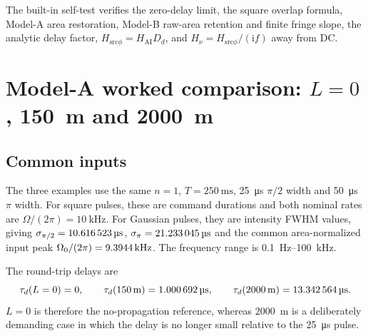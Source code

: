 \documentclass[11pt,a4paper]{article}
\newcommand{\ii}{\mathrm{i}}
\newcommand{\Hatom}{H_{\mathrm{AI}}}
\newcommand{\Hsrc}{H_{\mathrm{src}\phi}}
\newcommand{\Hnu}{H_{\nu}}
\newcommand{\taud}{\tau_{d}}
\begin{document}
\begin{checkbox}[Validation]
The built-in self-test verifies the zero-delay limit, the square overlap formula, Model-A area restoration, Model-B raw-area retention and finite fringe slope, the analytic delay factor, $\Hsrc=\Hatom D_d$, and $\Hnu=\Hsrc/(\ii f)$ away from DC.
\end{checkbox}

\section{Model-A worked comparison: $L=0$, \SI{150}{\metre} and \SI{2000}{\metre}}\label{sec:case}

\subsection{Common inputs}

The three examples use the same $n=1$, $T=\SI{250}{\milli\second}$, \SI{25}{\micro\second} $\pi/2$ width and \SI{50}{\micro\second} $\pi$ width. For square pulses, these are command durations and both nominal rates are $\Omega/(2\pi)=\SI{10}{\kilo\hertz}$. For Gaussian pulses, they are intensity FWHM values, giving $\sigma_{\pi/2}=\SI{10.616523}{\micro\second}$, $\sigma_{\pi}=\SI{21.233045}{\micro\second}$ and the common area-normalized input peak $\Omega_0/(2\pi)=\SI{9.3944}{\kilo\hertz}$. The frequency range is \SI{0.1}{\hertz}--\SI{100}{\kilo\hertz}.

The round-trip delays are
\begin{equation}
 \taud(L=0)=0,\qquad
 \taud(\SI{150}{\metre})=\SI{\CaseDelayOneFiftyUs}{\micro\second},\qquad
 \taud(\SI{2000}{\metre})=\SI{\CaseDelayTwoThousandUs}{\micro\second}.
\end{equation}
$L=0$ is therefore the no-propagation reference, whereas \SI{2000}{\metre} is a deliberately demanding case in which the delay is no longer small relative to the \SI{25}{\micro\second} pulse.
\end{document}
